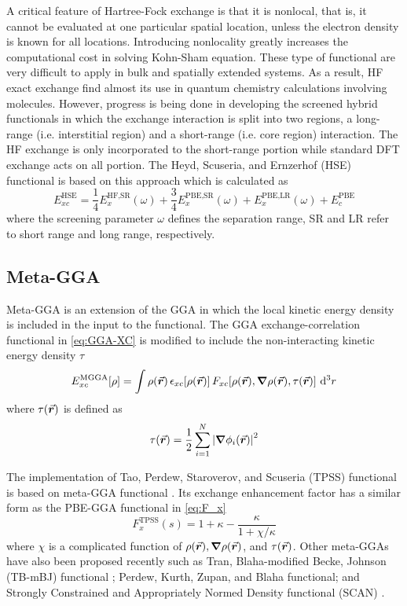 A critical feature of Hartree-Fock exchange is that it is nonlocal, that is, it cannot be evaluated at one particular spatial location, unless the electron density is known for all locations. Introducing nonlocality greatly increases the computational cost in solving Kohn-Sham equation. These type of functional are very difficult to apply in bulk and spatially extended systems. As a result, HF exact exchange find almost its use in quantum chemistry calculations involving molecules. 
However, progress is being done in developing the screened hybrid functionals in which the exchange interaction is split into two regions, a long-range (i.e. interstitial region) and a short-range (i.e. core region)  interaction. The HF exchange is only incorporated to the short-range portion while standard DFT exchange acts on all portion. The Heyd, Scuseria, and Ernzerhof (HSE) functional is based on this approach which is calculated as \citep{Heyd2003,Krukau2006}
\begin{equation}
	E_{xc}^{\text{HSE}} = \frac{1}{4} E_x^{\text{HF,SR}}(\omega) +  \frac{3}{4} E_x^{\text{PBE,SR}}(\omega) + E_x^{\text{PBE,LR}}(\omega) + E_c^{\text{PBE}}
\end{equation} 
where the screening parameter $\omega$ defines the separation
range, SR and LR refer to short range and long range, respectively. 


\subsection{Meta-GGA}
Meta-GGA is an extension of the GGA in which the local kinetic energy density is included in the input to the functional. The GGA exchange-correlation functional in \eqref{eq:GGA-XC} is modified to include the non-interacting kinetic energy density $\tau$ \citep{Staroverov2004}
\begin{equation}
	E^{\text{MGGA}}_{xc} [\rho]= \int \rho({\va*{r}})\, \epsilon_{xc}[\rho({\va*{r}})]\, F_{xc}[\rho({\va*{r}}),\grad \rho({\va*{r}}),\tau(\va*{r})] \,  \dd[3]{r}
\end{equation}
where $\tau(\va*{r})$ is  defined as 
\begin{equation}
	\tau(\va*{r}) = \frac{1}{2} \sum_{i=1}^N \abs{\grad \phi_i(\va*{r})}^2
\end{equation}

The implementation of Tao, Perdew, Staroverov, and Scuseria (TPSS) functional is based on meta-GGA functional \citep{Tao2003}. Its exchange enhancement factor  has a similar form as the PBE-GGA functional in \eqref{eq:F_x} \citep{Staroverov2004}
\begin{equation}
	F_{x}^{\text{TPSS}}(s) = 1 + \kappa  - \frac{\kappa}{1+\chi/\kappa}
\end{equation}
where $\chi$ is a complicated function of $\rho({\va*{r}}),\grad \rho({\va*{r}})$, and $\tau(\va*{r})$. Other  meta-GGAs  have  also been  proposed  recently such as Tran, Blaha-modified Becke, Johnson (TB-mBJ) functional \citep{Tran2009};  Perdew, Kurth, Zupan, and Blaha functional\citep{Perdew1999}; and Strongly Constrained and Appropriately Normed Density functional (SCAN) \citep{Sun2015}.


